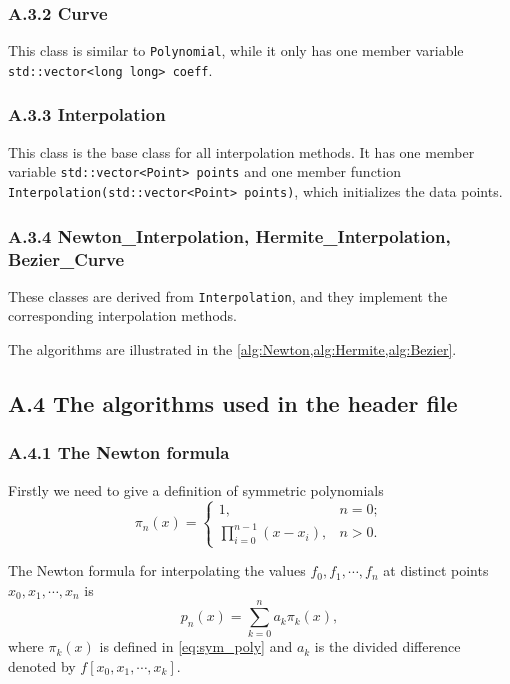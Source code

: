 \documentclass[a4paper]{article}
\begin{document}
\subsubsection*{A.3.2 Curve}

This class is similar to \verb|Polynomial|, while it only has one member variable \verb|std::vector<long long> coeff|.

\subsubsection*{A.3.3 Interpolation}

This class is the base class for all interpolation methods. It has one member variable \verb|std::vector<Point> points| and one member function \verb|Interpolation(std::vector<Point> points)|, which initializes the data points.

\subsubsection*{A.3.4 Newton\_Interpolation, Hermite\_Interpolation, Bezier\_Curve}

These classes are derived from \verb|Interpolation|, and they implement the corresponding interpolation methods.

The algorithms are illustrated in the \cref{alg:Newton,alg:Hermite,alg:Bezier}.

\subsection*{A.4 The algorithms used in the header file}

\subsubsection*{A.4.1 The Newton formula}

Firstly we need to give a definition of symmetric polynomials 
\begin{equation}
    \pi_n(x) = \begin{cases}
        1, & n = 0; \\
        \prod_{i = 0}^{n - 1} (x - x_i), & n > 0.
    \end{cases}
    \label{eq:sym_poly}
\end{equation}

The Newton formula for interpolating the values $f_0, f_1, \cdots, f_n$ at distinct points $x_0, x_1, \cdots, x_n$ is 
\begin{equation}
    p_n(x) = \sum_{k = 0}^n a_k \pi_k(x),
    \label{eq:Newton}
\end{equation}
where $\pi_k(x)$ is defined in \cref{eq:sym_poly} and $a_k$ is the divided difference denoted by $f[x_0, x_1, \cdots, x_k]$.
\end{document}
